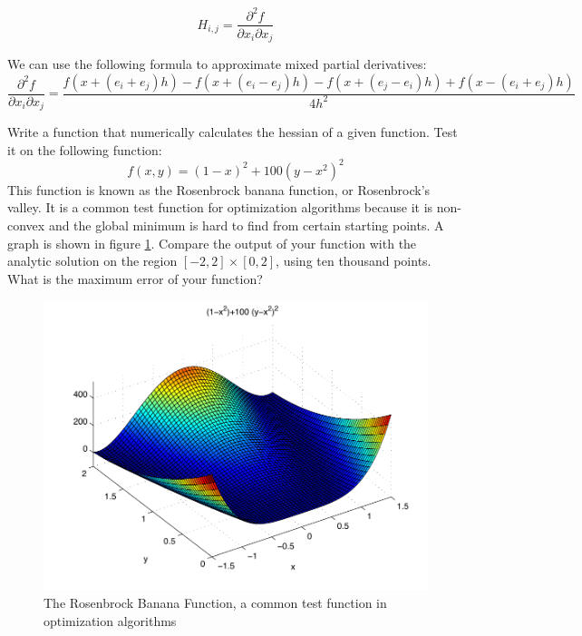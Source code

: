 \[
H_{i,j} = \frac{\partial^2 f}{\partial x_i \partial x_j}
\]

We can use the following formula to approximate mixed partial derivatives:
\small
\[
\frac{\partial^2 f}{\partial x_i \partial x_j} = \frac{f(x + (e_i + e_j)h) - f(x + (e_i-e_j)h) -f(x + (e_j-e_i)h) + f(x - (e_i + e_j)h)}{4h^2}
\]
\normalsize

\begin{problem}
Write a \ProgrammingLanguage function that numerically calculates the hessian of a given function. Test it on the following function:
\[
f(x,y) = (1-x)^2 + 100(y-x^2)^2
\]
This function is known as the Rosenbrock banana function, or Rosenbrock's valley. It is a common test function for optimization algorithms because it is non-convex and the global minimum is hard to find from certain starting points. A graph is shown in figure \ref{Fig:Rosenbrock}. Compare the output of your function with the analytic solution on the region $[-2,2]\times [0,2]$, using ten thousand points. What is the maximum error of your function?
\end{problem}
\begin{figure}
\begin{center}
\includegraphics[scale = .8]{./Figures/Rosenbrock}
\caption{The Rosenbrock Banana Function, a common test function in optimization algorithms}
\label{Fig:Rosenbrock}
\end{center}
\end{figure}